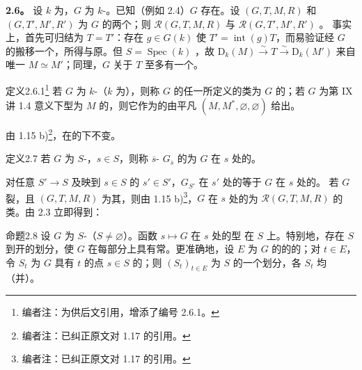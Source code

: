 \textbf{2.6。} 设 $k$ 为，$G$ 为 $k$-。已知（例如 2.4）$G$ 存在。设 $(G,T,M,R)$ 和 $(G,T',M',R')$ 为 $G$ 的两个；则 $\mathcal R(G,T,M,R)$ 与 $\mathcal R(G,T',M',R')$ 。
事实上，首先可归结为 $T=T'$：存在 $g\in G(k)$ 使 $T'=\operatorname{int}(g)T$，而易验证经 $G$ 的搬移一个，所得与原。但 $S=\operatorname{Spec}(k)$ ，故 $\mathrm D_k(M)\xrightarrow\sim T\xrightarrow\sim\mathrm D_k(M')$ 来自唯一 $M\simeq M'$；同理，$G$ 关于 $T$ 至多有一个。
\begin{SGAresult}{定义}{2.6.1}\footnote{编者注：为供后文引用，增添了编号 2.6.1。} 若 $G$ 为 $k$-（$k$ 为），则称 $G$ 的任一所定义的类为 $G$ 的；若 $G$ 为第 IX 讲 1.4 意义下型为 $M$ 的，则它作为的由平凡 $(M,M^*,\varnothing,\varnothing)$ 给出。\end{SGAresult}
由 1.15 b)\footnote{编者注：已纠正原文对 1.17 的引用。}，在的下不变。
\begin{SGAresult}{定义}{2.7} 若 $G$ 为 $S$-，$s\in S$，则称 $\overline s$- $G_{\overline s}$ 的为 $G$ 在 $s$ 处的。\end{SGAresult}
对任意 $S'\to S$ 及映到 $s\in S$ 的 $s'\in S'$，$G_{S'}$ 在 $s'$ 处的等于 $G$ 在 $s$ 处的。
若 $G$ 裂，且 $(G,T,M,R)$ 为其，则由 1.15 b)\footnote{编者注：已纠正原文对 1.17 的引用。}，$G$ 在 $s$ 处的为 $\mathcal R(G,T,M,R)$ 的类。由 2.3 立即得到：
\begin{SGAresult}{命题}{2.8} 设 $G$ 为 $S$-（$S\ne\varnothing$）。函数 $s\mapsto G\text{ 在 }s\text{ 处的型}$ 在 $S$ 上。特别地，存在 $S$ 到开的划分，使 $G$ 在每部分上具有常。更准确地，设 $E$ 为 $G$ 的的的；对 $t\in E$，令 $S_t$ 为 $G$ 具有 $t$ 的点 $s\in S$ 的；则 $(S_t)_{t\in E}$ 为 $S$ 的一个划分，各 $S_t$ 均（并）。\end{SGAresult}

